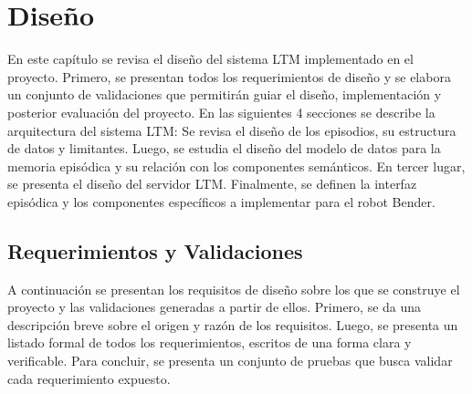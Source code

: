 \chapter{Diseño}\label{chapter:diseno}

En este capítulo se revisa el diseño del sistema LTM implementado en el proyecto. Primero, se presentan todos los requerimientos de diseño y se elabora un conjunto de validaciones que permitirán guiar el diseño, implementación y posterior evaluación del proyecto. En las siguientes 4 secciones se describe la arquitectura del sistema LTM: Se revisa el diseño de los episodios, su estructura de datos y limitantes. Luego, se estudia el diseño del modelo de datos para la memoria episódica y su relación con los componentes semánticos. En tercer lugar, se presenta el diseño del servidor LTM. Finalmente, se definen la interfaz episódica y los componentes específicos a implementar para el robot Bender.




\section{Requerimientos y Validaciones}

A continuación se presentan los requisitos de diseño sobre los que se construye el proyecto y las validaciones generadas a partir de ellos. Primero, se da una descripción breve sobre el origen y razón de los requisitos. Luego, se presenta un listado formal de todos los requerimientos, escritos de una forma clara y verificable. Para concluir, se presenta un conjunto de pruebas que busca validar cada requerimiento expuesto.

